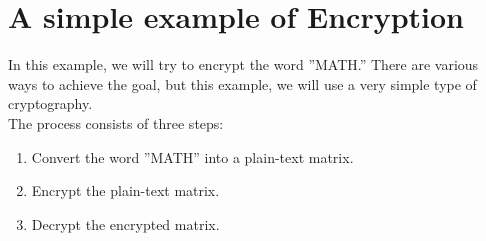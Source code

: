 \documentclass[11pt]{article}
\begin{document}
\section{A simple example of Encryption}
\phantom{x}\hspace{3mm}In this example, we will try to encrypt the word ''MATH.'' There are various ways to achieve the goal, but this example, we will use a very simple type of cryptography.\\
\phantom{x}\hspace{1mm}The process consists of three steps:

\begin{enumerate}[1.]
\addtolength{\itemindent}{20mm}
	\item Convert the word ''MATH'' into a plain-text matrix.
	\item Encrypt the plain-text matrix.
	\item Decrypt the encrypted matrix.
\end{enumerate}
\end{document}
